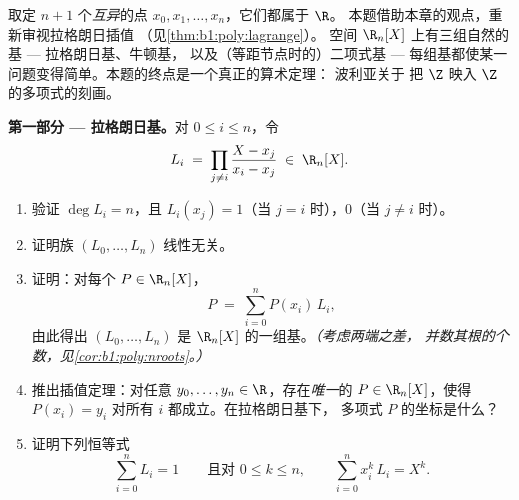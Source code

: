 \begin{problem}\label{pb:b1:vspaces:1}
取定 $n + 1$ 个\emph{互异}的点 $x_0, x_1, \dots, x_n$，它们都属于 $\R$。
本题借助本章的观点，重新审视拉格朗日插值
（见\cref{thm:b1:poly:lagrange}）。
空间 $\R_n[X]$ 上有三组自然的基 --- 拉格朗日基、牛顿基，
以及（等距节点时的）二项式基 ---
每组基都使某一问题变得简单。本题的终点是一个真正的算术定理：
波利亚关于
把 $\Z$ 映入 $\Z$ 的多项式的刻画。

\medskip
\noindent\textbf{第一部分 --- 拉格朗日基。}对 $0 \leq i
\leq n$，令
\[
L_i \;=\; \prod_{j \neq i} \frac{X - x_j}{x_i - x_j} \;\in\;
\R_n[X].
\]
\begin{enumerate}
  \item 验证 $\deg L_i = n$，且 $L_i(x_j) = 1$（当 $j =
        i$ 时），$0$（当 $j \neq i$ 时）。
  \item 证明族 $(L_0, \dots, L_n)$ 线性无关。
  \item 证明：对每个 $P \in \R_n[X]$，
        \[
        P \;=\; \sum_{i=0}^{n} P(x_i)\, L_i ,
        \]
        由此得出 $(L_0, \dots, L_n)$ 是
        $\R_n[X]$ 的一组基。\emph{（考虑两端之差，
        并数其根的个数，见\cref{cor:b1:poly:nroots}。）}
  \item 推出插值定理：对任意 $y_0,
        \dots, y_n \in \R$，存在\emph{唯一}的 $P \in
        \R_n[X]$，使得 $P(x_i) = y_i$ 对所有 $i$ 都成立。在拉格朗日基下，
        多项式 $P$ 的坐标是什么？
  \item 证明下列恒等式
        \[
        \sum_{i=0}^{n} L_i = 1
        \qquad\text{且对 } 0 \leq k \leq n,\qquad
        \sum_{i=0}^{n} x_i^{k}\, L_i = X^{k} .
        \]
\end{enumerate}


\end{problem}
